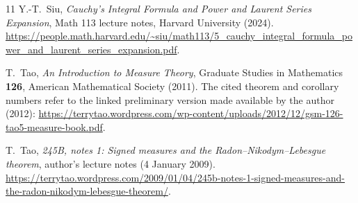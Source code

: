 \documentclass[11pt]{article}
\theoremstyle{remark}
\numberwithin{equation}{section}
\begin{document}
\begin{thebibliography}{11}
Y.-T.~Siu, \emph{Cauchy's Integral Formula and Power and Laurent Series Expansion},
Math 113 lecture notes, Harvard University (2024).
\url{https://people.math.harvard.edu/~siu/math113/5_cauchy_integral_formula_power_and_laurent_series_expansion.pdf}.

T.~Tao, \emph{An Introduction to Measure Theory},
Graduate Studies in Mathematics \textbf{126},
American Mathematical Society (2011).
The cited theorem and corollary numbers refer to the linked preliminary
version made available by the author (2012):
\url{https://terrytao.wordpress.com/wp-content/uploads/2012/12/gsm-126-tao5-measure-book.pdf}.

T.~Tao, \emph{245B, notes 1: Signed measures and the
Radon--Nikodym--Lebesgue theorem}, author's lecture notes (4 January 2009).
\url{https://terrytao.wordpress.com/2009/01/04/245b-notes-1-signed-measures-and-the-radon-nikodym-lebesgue-theorem/}.
\end{thebibliography}
\endgroup
\end{document}
